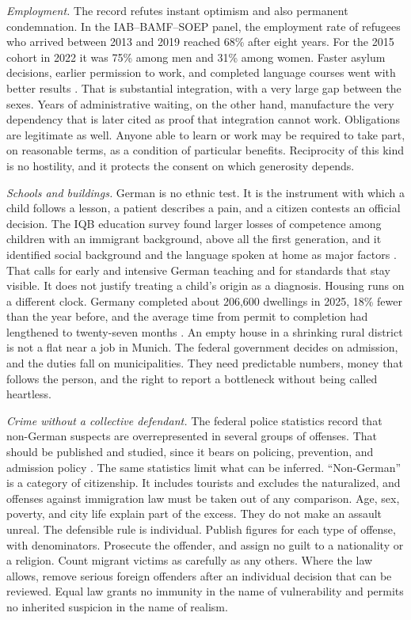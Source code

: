 \documentclass[12pt,a4paper]{book}
\begin{document}
\emph{Employment.} The record refutes instant optimism and also permanent condemnation. In the IAB--BAMF--SOEP panel, the employment rate of refugees who arrived between 2013 and 2019 reached 68\% after eight years. For the 2015 cohort in 2022 it was 75\% among men and 31\% among women. Faster asylum decisions, earlier permission to work, and completed language courses went with better results \cite{IABRefugeeEmployment2024}. That is substantial integration, with a very large gap between the sexes. Years of administrative waiting, on the other hand, manufacture the very dependency that is later cited as proof that integration cannot work. Obligations are legitimate as well. Anyone able to learn or work may be required to take part, on reasonable terms, as a condition of particular benefits. Reciprocity of this kind is no hostility, and it protects the consent on which generosity depends.

\emph{Schools and buildings.} German is no ethnic test. It is the instrument with which a child follows a lesson, a patient describes a pain, and a citizen contests an official decision. The IQB education survey found larger losses of competence among children with an immigrant background, above all the first generation, and it identified social background and the language spoken at home as major factors \cite{KMKIQBBildungstrend2022}. That calls for early and intensive German teaching and for standards that stay visible. It does not justify treating a child's origin as a diagnosis. Housing runs on a different clock. Germany completed about 206,600 dwellings in 2025, 18\% fewer than the year before, and the average time from permit to completion had lengthened to twenty-seven months \cite{DestatisHousing2026}. An empty house in a shrinking rural district is not a flat near a job in Munich. The federal government decides on admission, and the duties fall on municipalities. They need predictable numbers, money that follows the person, and the right to report a bottleneck without being called heartless.

\emph{Crime without a collective defendant.} The federal police statistics record that non-German suspects are overrepresented in several groups of offenses. That should be published and studied, since it bears on policing, prevention, and admission policy \cite{BKAPKS2024}. The same statistics limit what can be inferred. ``Non-German'' is a category of citizenship. It includes tourists and excludes the naturalized, and offenses against immigration law must be taken out of any comparison. Age, sex, poverty, and city life explain part of the excess. They do not make an assault unreal. The defensible rule is individual. Publish figures for each type of offense, with denominators. Prosecute the offender, and assign no guilt to a nationality or a religion. Count migrant victims as carefully as any others. Where the law allows, remove serious foreign offenders after an individual decision that can be reviewed. Equal law grants no immunity in the name of vulnerability and permits no inherited suspicion in the name of realism.
\end{document}
